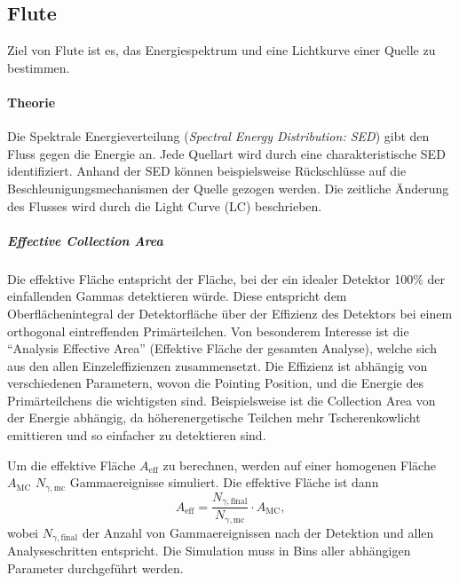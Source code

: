 \subsection{Flute}%
\label{sub:flute}

Ziel von Flute ist es, 
das Energiespektrum und
eine Lichtkurve einer Quelle zu bestimmen.

\paragraph{Theorie}%

Die
Spektrale Energieverteilung (\textit{Spectral Energy Distribution: SED})
gibt den Fluss gegen die Energie an. 
Jede Quellart wird durch eine charakteristische SED identifiziert. 
Anhand der SED können beispielsweise Rückschlüsse auf die
Beschleunigungsmechanismen der Quelle gezogen werden.
Die zeitliche Änderung des Flusses wird durch die Light Curve (LC) beschrieben.

\subparagraph{Effective Collection Area}
Die effektive Fläche entspricht der Fläche,
bei der ein idealer Detektor 100\%
der einfallenden Gammas detektieren würde.
Diese entspricht dem Oberflächenintegral der Detektorfläche
über der Effizienz des Detektors
bei einem orthogonal eintreffenden Primärteilchen.
Von besonderem Interesse ist die \enquote{Analysis Effective Area}
(Effektive Fläche der gesamten Analyse),
welche sich aus den allen Einzeleffizienzen zusammensetzt.
Die Effizienz ist abhängig von verschiedenen Parametern,
wovon die Pointing Position,
und die Energie des Primärteilchens
die wichtigsten sind.
Beispielsweise ist die Collection Area von der Energie abhängig,
da höherenergetische Teilchen mehr Tscherenkowlicht emittieren
und so einfacher zu detektieren sind.

Um die effektive Fläche $A_{\text{eff}}$ zu berechnen,
werden auf einer homogenen Fläche $A_{\text{MC}}$ $N_{\gamma,\text{mc}}$ Gammaereignisse simuliert.
Die effektive Fläche ist dann
\begin{equation}%
  \label{eq:effective_area}
  A_{\text{eff}} =
    \frac{N_{\gamma,\text{final}}}{N_{\gamma,\text{mc}}}
    \cdot A_{\text{MC}} ,
\end{equation}
wobei $N_{\gamma,\text{final}}$ der Anzahl von Gammaereignissen nach der Detektion
und allen Analyseschritten entspricht.
Die Simulation muss in Bins aller abhängigen Parameter durchgeführt werden.



